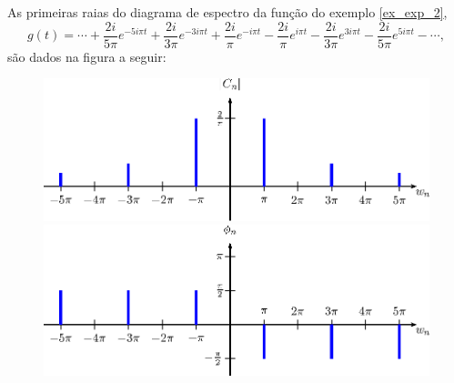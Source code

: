 \begin{ex} As primeiras raias do diagrama de espectro da função do exemplo \ref{ex_exp_2},
\begin{equation}
g(t)=\cdots+\frac{2i}{5\pi}e^{-5i\pi t}+\frac{2i}{3\pi}e^{-3i\pi t}+\frac{2i}{\pi}e^{-i\pi t}-\frac{2i}{\pi}e^{i\pi t}-\frac{2i}{3\pi}e^{3i\pi t}-\frac{2i}{5\pi}e^{5i\pi t}-\cdots,
\end{equation}
são dados na figura a seguir:
\begin{figure}[!ht] 
\includegraphics{cap_diagramas_espectro/pics/figura_4}
\includegraphics{cap_diagramas_espectro/pics/figura_5}
\end{figure}
\end{ex}

